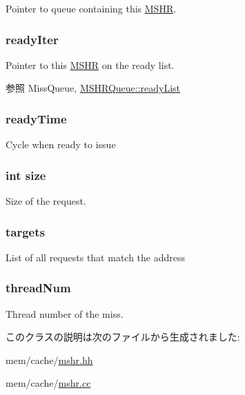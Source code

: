 \label{classMSHR_a524ec1b0c7b11e23904171e42211679e}
Pointer to queue containing this \hyperlink{classMSHR}{MSHR}. \hypertarget{classMSHR_a6ff6af8d20926ded4e18e8f676784ff6}{
\subsubsection[{readyIter}]{ {\bf readyIter}}}
\label{classMSHR_a6ff6af8d20926ded4e18e8f676784ff6}
Pointer to this \hyperlink{classMSHR}{MSHR} on the ready list. \begin{DoxySeeAlso}{参照}
MissQueue, \hyperlink{classMSHRQueue_ab090e7fb494c0f9af81d19d1959684a0}{MSHRQueue::readyList} 
\end{DoxySeeAlso}
\hypertarget{classMSHR_a7cb362ebfb8750bd53baf5e8f96e00d0}{
\subsubsection[{readyTime}]{ {\bf readyTime}}}
\label{classMSHR_a7cb362ebfb8750bd53baf5e8f96e00d0}
Cycle when ready to issue \hypertarget{classMSHR_a439227feff9d7f55384e8780cfc2eb82}{
\subsubsection[{size}]{\setlength{\rightskip}{0pt plus 5cm}int {\bf size}}}
\label{classMSHR_a439227feff9d7f55384e8780cfc2eb82}
Size of the request. \hypertarget{classMSHR_ac0771ddfd90fe1ffe0d2da35dad7dd36}{
\subsubsection[{targets}]{ {\bf targets}}}
\label{classMSHR_ac0771ddfd90fe1ffe0d2da35dad7dd36}
List of all requests that match the address \hypertarget{classMSHR_a7ec985ceacc8f2c379dbccca0b2e0f44}{
\subsubsection[{threadNum}]{ {\bf threadNum}}}
\label{classMSHR_a7ec985ceacc8f2c379dbccca0b2e0f44}
Thread number of the miss. 

このクラスの説明は次のファイルから生成されました:\begin{DoxyCompactItemize}
\item 
mem/cache/\hyperlink{mshr_8hh}{mshr.hh}\item 
mem/cache/\hyperlink{mshr_8cc}{mshr.cc}\end{DoxyCompactItemize}
